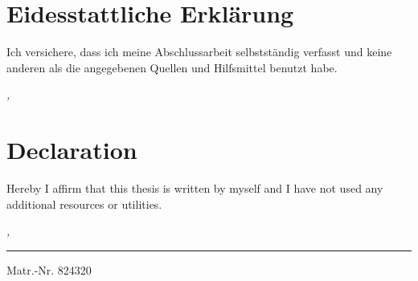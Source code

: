 \chapter*{Eidesstattliche Erklärung}
\label{sec:declaration}
\vspace*{-10mm}
\thispagestyle{empty}

Ich versichere, dass ich meine Abschlussarbeit selbstständig verfasst und keine 
anderen als die angegebenen Quellen und Hilfsmittel benutzt habe.

\bigskip
\noindent\textit{\thesisUniversityCity, \thesisDate}

\vfill
\begin{center}
	\hrulefill
\end{center}
\vspace*{-20mm}
{\let\clearpage\relax\chapter*{Declaration}}
\vspace*{-10mm}

Hereby I affirm that this thesis is written by myself and I have not used any 
additional resources or utilities.

\bigskip
\noindent\textit{\thesisUniversityCity, \thesisDate}

\vfill
\smallskip

\begin{flushright}
	\begin{minipage}{6.5cm}
		\rule{\textwidth}{1pt}
		\centering Matr.-Nr. 824320 \hfill \thesisName
	\end{minipage}
\end{flushright}